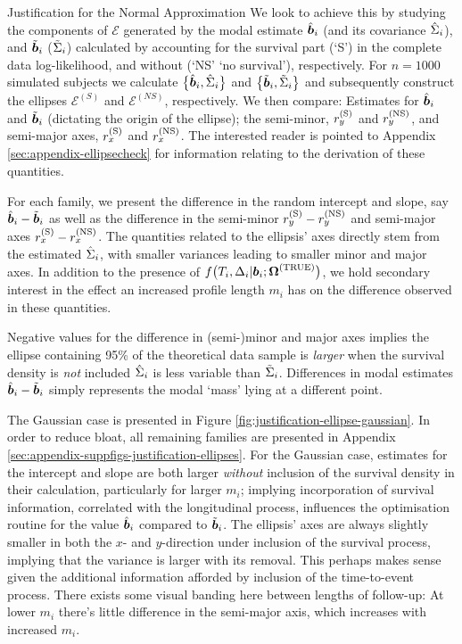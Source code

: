 \begin{chapter}{\label{cha:justification}Justification for the Normal Approximation}
  We look to achieve this by studying the components of $\mathcal{E}$ generated by the modal estimate $\hat{\bm{b}}_i$ (and its covariance $\hat{\Sigma}_i$), and $\tilde{\bm{b}}_i$ ($\tilde{\Sigma}_i$) calculated by accounting for the survival part (`S') in the complete data log-likelihood, and without (`NS' \ie `no survival'), respectively. For $n=1000$ simulated subjects we calculate $\big\{\hat{\bm{b}}_i,\hat{\Sigma}_i\big\}$ and $\big\{\tilde{\bm{b}}_i,\tilde{\Sigma}_i\big\}$ and subsequently construct the ellipses $\mathcal{E}^{(S)}$ and $\mathcal{E}^{(NS)}$, respectively. We then compare: Estimates for $\hat{\bm{b}}_i$ and $\tilde{\bm{b}}_i$ (dictating the origin of the ellipse); the semi-minor, $r_y^{(\mathrm{S})}$ and $r_y^{(\mathrm{NS})}$, and semi-major axes, $r_x^{(\mathrm{S})}$ and $r_x^{(\mathrm{NS})}$. The interested reader is pointed to Appendix \ref{sec:appendix-ellipsecheck} for information relating to the derivation of these quantities.

  For each family, we present the difference in the random intercept and slope, say $\hat{\bm{b}}_i-\tilde{\bm{b}}_i$ as well as the difference in the semi-minor $r_y^{(\mathrm{S})}-r_y^{(\mathrm{NS})}$ and semi-major axes $r_x^{(\mathrm{S})}-r_x^{(\mathrm{NS})}$. The quantities related to the ellipsis' axes directly stem from the estimated $\hat{\Sigma}_i$, with smaller variances leading to smaller minor and major axes. In addition to the presence of $f\big(T_i,\Delta_i|\bm{b}_i;\bm{\mathrm{\Omega}}^{(\mathrm{TRUE})}\big)$, we hold secondary interest in the effect an increased profile length $m_i$ has on the difference observed in these quantities. 
  
  Negative values for the difference in (semi-)minor and major axes implies the ellipse containing 95\% of the theoretical data sample is \textit{larger} when the survival density is \textit{not} included \ie $\hat{\Sigma}_i$ is less variable than $\tilde{\Sigma}_i$. Differences in modal estimates $\hat{\bm{b}}_i-\tilde{\bm{b}}_i$ simply represents the modal `mass' lying at a different point.
  
  The Gaussian case is presented in Figure \ref{fig:justification-ellipse-gaussian}. In order to reduce bloat, all remaining families are presented in Appendix \ref{sec:appendix-suppfigs-justification-ellipses}. For the Gaussian case, estimates for the intercept and slope are both larger \textit{without} inclusion of the survival density in their calculation, particularly for larger $m_i$; implying incorporation of survival information, correlated with the longitudinal process, influences the optimisation routine for the value $\hat{\bm{b}}_i$ compared to $\tilde{\bm{b}}_i$. The ellipsis' axes are always slightly smaller in both the $x$- and $y$-direction under inclusion of the survival process, implying that the variance is larger with its removal. This perhaps makes sense given the additional information afforded by inclusion of the time-to-event process. There exists some visual banding here between lengths of follow-up: At lower $m_i$ there's little difference in the semi-major axis, which increases with increased $m_i$.


\end{chapter}
